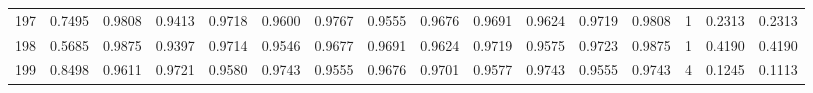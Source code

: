\begin{tabular}{lrrrrrrrrrrrrrrr}
197 &      0.7495 &  0.9808 &  0.9413 &  0.9718 &  0.9600 &  0.9767 &  0.9555 &  0.9676 &  0.9691 &  0.9624 &   0.9719 &     0.9808 &      1 &                    0.2313 &                     0.2313 \\
198 &      0.5685 &  0.9875 &  0.9397 &  0.9714 &  0.9546 &  0.9677 &  0.9691 &  0.9624 &  0.9719 &  0.9575 &   0.9723 &     0.9875 &      1 &                    0.4190 &                     0.4190 \\
199 &      0.8498 &  0.9611 &  0.9721 &  0.9580 &  0.9743 &  0.9555 &  0.9676 &  0.9701 &  0.9577 &  0.9743 &   0.9555 &     0.9743 &      4 &                    0.1245 &                     0.1113 \\
\bottomrule
\end{tabular}
